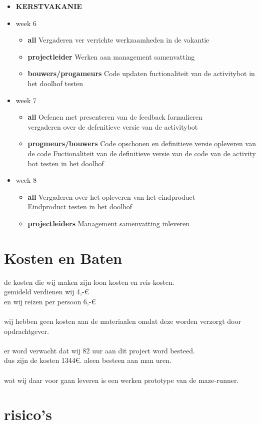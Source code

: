 \documentclass[oneside]{book}
\begin{document}
\begin{itemize}
\item \textbf{KERSTVAKANIE}
\item week 6
	\begin{itemize}	
	\item \textbf{all}
		Vergaderen ver verrichte werkzaamheden in de vakantie
	\item \textbf{projectleider}
		Werken aan management samenvatting
	\item \textbf{bouwers/progameurs}
		Code updaten
		fuctionaliteit van de activitybot in het doolhof testen
	\end{itemize}
\item week 7
	\begin{itemize}	
	\item \textbf{all}
		Oefenen met presenteren van de feedback formulieren\\
		vergaderen over de defenitieve versie van de activitybot
	\item \textbf{progmeurs/bouwers}
		Code opschonen en definitieve versie opleveren van de code
		Fuctionaliteit van de definitieve versie van de code van de activity bot testen in het doolhof
	\end{itemize}
\item week 8
	\begin{itemize}	
	\item \textbf{all}
		Vergaderen over het opleveren van het eindproduct\\
		Eindproduct testen in het doolhof
	\item \textbf{projectleiders}
		Management samenvatting inleveren
	\end{itemize}
\end{itemize}
\clearpage
\chapter{Kosten en Baten}
de kosten die wij maken zijn loon kosten en reis kosten.\\
gemideld verdienen wij 4,-\euro{} \\
en wij reizen per persoon 6,-\euro{} \\ 
\\
wij hebben geen kosten aan de materiaalen omdat deze worden verzorgt door opdrachtgever.\\
\\
er word verwacht dat wij 82 uur aan dit project word besteed.\\
dus zijn de kosten 1344\euro{}. aleen besteen aan man uren.\\
\\
wat wij daar voor gaan leveren is een werken prototype van de maze-runner.
\clearpage
\chapter{risico's}

\clearpage
\end{document}
